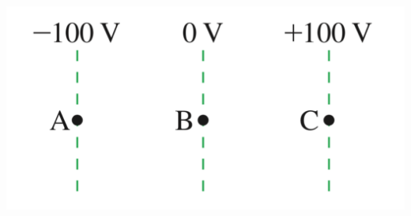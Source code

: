 \documentclass[12pt]{article}
\begin{document}
\begin{enumerate}
\begin{center}
\includegraphics[width=.45\linewidth]{W3-fig3}
\end{center}

\end{enumerate}
\end{document}
